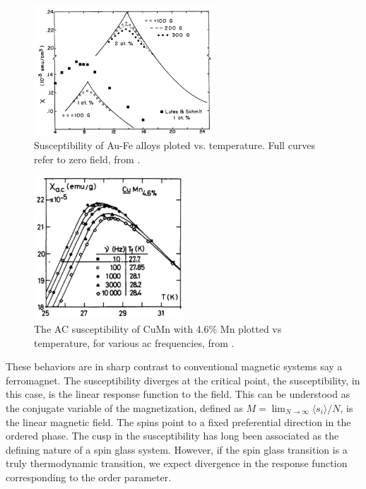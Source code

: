 \begin{figure}
  \centering
  \includegraphics[width=0.6\textwidth]{img/cusp.png}
  \caption{\label{fig:au-fe-cusp}Susceptibility of Au-Fe alloys ploted vs. temperature. Full curves refer to zero field, from \citet{PhysRevB.6.4220}.}
\end{figure}
\begin{figure}
  \centering
  \includegraphics[width=0.5\textwidth]{img/ac-chi-freq.png}
  \caption{\label{fig:ac-chi-freq}The AC susceptibility of CuMn with 4.6\% Mn plotted vs temperature, for various ac frequencies, from \citet{THOLENCE1980113}.}
\end{figure}

These behaviors are in sharp contrast to conventional magnetic systems say a ferromagnet. 
The susceptibility diverges at the critical point, the susceptibility,
in this case, is the linear response function to the field. This can be understood 
as the conjugate variable of the magnetization, defined as 
$M=\lim_{N \rightarrow \infty} \langle s_{i}\rangle / N$, 
is the linear magnetic field. 
The spins point to a fixed preferential direction in the ordered phase. 
The cusp in the susceptibility has long been associated as the defining nature 
of a spin glass system. However, if the spin glass transition is a truly 
thermodynamic transition, we expect divergence in the response function
corresponding to the order parameter. 

